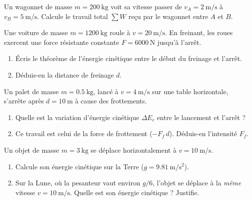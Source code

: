 \documentclass[11pt,a4paper]{article}
\begin{document}

\begin{exo}
Un wagonnet de masse $m=\qty{200}{\kilogram}$ voit sa vitesse passer de $v_A=\qty{2}{\metre\per\second}$
à $v_B=\qty{5}{\metre\per\second}$. Calcule le travail total $\sum W$ reçu par le wagonnet entre $A$
et $B$.
\end{exo}

\begin{exo}
Une voiture de masse $m=\qty{1200}{\kilogram}$ roule à $v=\qty{20}{\metre\per\second}$. En freinant,
les roues exercent une force résistante constante $F=\qty{6000}{\newton}$ jusqu'à l'arrêt.
\begin{enumerate}[label=\alph*)]
  \item Écris le théorème de l'énergie cinétique entre le début du freinage et l'arrêt.
  \item Déduis-en la distance de freinage $d$.
\end{enumerate}
\end{exo}

\begin{exo}
Un palet de masse $m=\qty{0,5}{\kilogram}$, lancé à $v=\qty{4}{\metre\per\second}$ sur une table
horizontale, s'arrête après $d=\qty{10}{\metre}$ à cause des frottements.
\begin{enumerate}[label=\alph*)]
  \item Quelle est la variation d'énergie cinétique $\Delta E_c$ entre le lancement et l'arrêt ?
  \item Ce travail est celui de la force de frottement ($-F_f\,d$). Déduis-en l'intensité $F_f$.
\end{enumerate}
\end{exo}

\begin{exo}
Un objet de masse $m=\qty{3}{\kilogram}$ se déplace horizontalement à $v=\qty{10}{\metre\per\second}$.
\begin{enumerate}[label=\alph*)]
  \item Calcule son énergie cinétique sur la Terre ($g=\qty{9,81}{\metre\per\second\squared}$).
  \item Sur la Lune, où la pesanteur vaut environ $g/6$, l'objet se déplace à la \emph{même} vitesse
        $v=\qty{10}{\metre\per\second}$. Quelle est son énergie cinétique ? Justifie.
\end{enumerate}
\end{exo}
\end{document}
